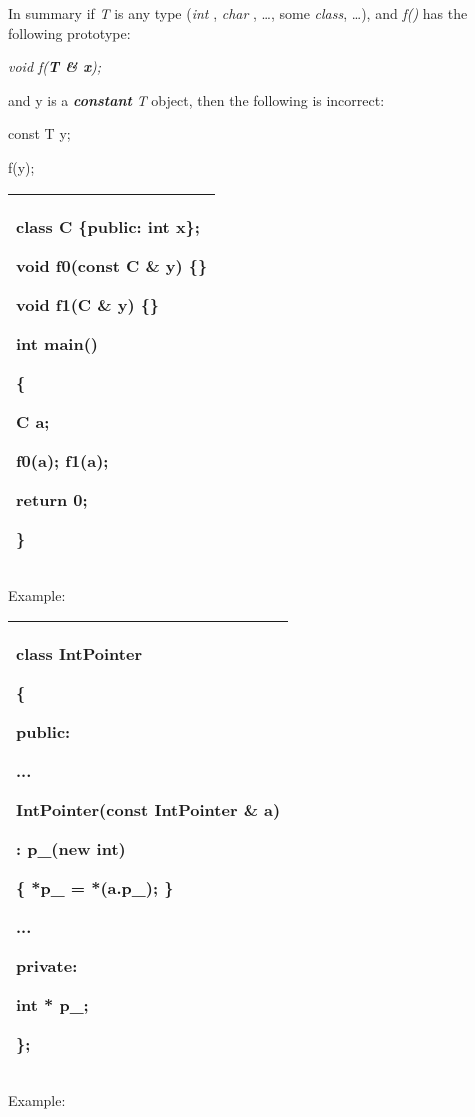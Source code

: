 \documentclass[
]{article}
\begin{document}
In summary if \emph{T} is any type (\emph{int} , \emph{char} , \ldots,
some \emph{class}, \ldots), and \emph{f()} has the following prototype:

\emph{void f(\textbf{T \& x});}

and y is a \emph{\textbf{constant}} \emph{T} object, then the following
is incorrect:

const T y;

f(y);

\begin{longtable}[]{@{}l@{}}
\toprule
\endhead
\begin{minipage}[t]{0.97\columnwidth}\raggedright
class C \{public: int x\};

void f0(const C \& y) \{\}

void f1(C \& y) \{\}

int main()

\{

C a;

f0(a); f1(a);

return 0;

\}\strut
\end{minipage}\tabularnewline
\bottomrule
\end{longtable}

Example:

\begin{longtable}[]{@{}l@{}}
\toprule
\endhead
\begin{minipage}[t]{0.97\columnwidth}\raggedright
class IntPointer

\{

public:

...

IntPointer(\textbf{const} IntPointer \& a)

: p\_(new int)

\{ *p\_ = *(a.p\_); \}

...

private:

int * p\_;

\};\strut
\end{minipage}\tabularnewline
\bottomrule
\end{longtable}

Example:
\end{document}
